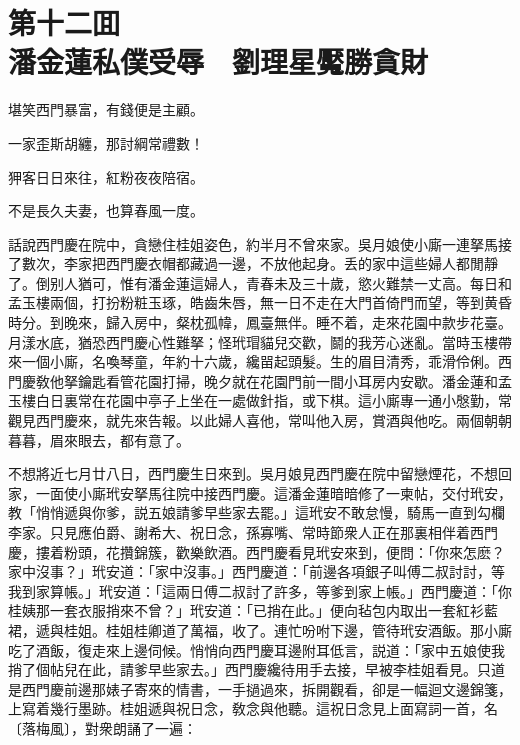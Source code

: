 
\chapter*{第十二囬　\\潘金蓮私僕受辱　劉理星魘勝貪財}


\begin{myquote}
堪笑西門暴富，有錢便是主顧。

一家歪斯胡纏，那討綱常禮數！

狎客日日來往，紅粉夜夜陪宿。

不是長久夫妻，也算春風一度。
\end{myquote}

話說西門慶在院中，貪戀住桂姐姿色，約半月不曾來家。吳月娘使小廝一連拏馬接了數次，李家把西門慶衣帽都藏過一邊，不放他起身。丢的家中這些婦人都閒靜了。倒别人猶可，惟有潘金蓮這婦人，青春未及三十歲，慾火難禁一丈高。每日和孟玉樓兩個，打扮粉粧玉琢，皓齒朱唇，無一日不走在大門首倚門而望，等到黄昏時分。到晚來，歸入房中，粲枕孤幃，鳳臺無伴。睡不着，走來花園中款步花臺。月漾水底，猶恐西門慶心性難拏；怪玳瑁貓兒交歡，鬬的我芳心迷亂。當時玉樓帶來一個小廝，名喚琴童，年約十六歲，纔㽞起頭髮。生的眉目清秀，乖滑伶俐。西門慶敎他拏鑰匙看管花園打掃，晚夕就在花園門前一間小耳房内安歇。潘金蓮和孟玉樓白日裏常在花園中亭子上坐在一處做針指，或下棋。這小廝專一通小慇勤，常觀見西門慶來，就先來告報。以此婦人喜他，常叫他入房，賞酒與他吃。兩個朝朝暮暮，眉來眼去，都有意了。

不想將近七月廿八日，西門慶生日來到。吳月娘見西門慶在院中留戀煙花，不想回家，一面使小廝玳安拏馬往院中接西門慶。這潘金蓮暗暗修了一柬帖，交付玳安，教「悄悄遞與你爹，説五娘請爹早些家去罷。」這玳安不敢怠慢，騎馬一直到勾欄李家。只見應伯爵、謝希大、祝日念，孫寡嘴、常時節衆人正在那裏相伴着西門慶，摟着粉頭，花攢錦簇，歡樂飲酒。西門慶看見玳安來到，便問：「你來怎麽？家中沒事？」玳安道：「家中沒事。」西門慶道：「前邊各項銀子叫傅二叔討討，等我到家算帳。」玳安道：「這兩日傅二叔討了許多，等爹到家上帳。」西門慶道：「你桂姨那一套衣服捎來不曾？」玳安道：「已捎在此。」便向毡包内取出一套紅衫藍裙，遞與桂姐。桂姐桂卿道了萬福，收了。連忙吩咐下邊，管待玳安酒飯。那小廝吃了酒飯，復走來上邊伺候。悄悄向西門慶耳邊附耳低言，説道：「家中五娘使我捎了個帖兒在此，請爹早些家去。」西門慶纔待用手去接，早被李桂姐看見。只道是西門慶前邊那婊子寄來的情書，一手撾過來，拆開觀看，卻是一幅迴文邊錦箋，上寫着幾行墨跡。桂姐遞與祝日念，敎念與他聽。這祝日念見上面寫詞一首，名〔落梅風〕，對衆朗誦了一遍：

